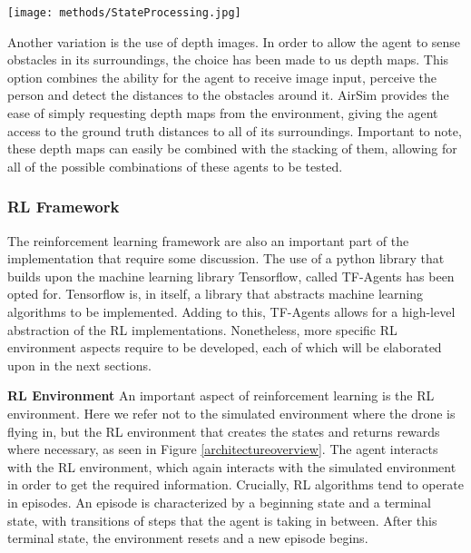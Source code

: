 \begin{Figure}
    \centering
    \texttt{[image: methods/StateProcessing.jpg]}
    \label{pipeline}
\end{Figure}

Another variation is the use of depth images. 
In order to allow the agent to sense obstacles in its surroundings, the choice has been made 
to us depth maps. This option combines the ability for the agent to receive image input, 
perceive the person and detect the distances to the obstacles around it. AirSim provides 
the ease of simply requesting depth maps from the environment, giving the agent access to 
the ground truth distances to all of its surroundings. Important to note, these depth 
maps can easily be combined with the stacking of them, allowing for all of the possible 
combinations of these agents to be tested.  \newline

\subsubsection{RL Framework} \label{RLframe}
The reinforcement learning framework are also an important part of the implementation that 
require some discussion. The use of a python library that builds 
upon the machine learning library Tensorflow, called TF-Agents has been opted for. Tensorflow is, 
in itself, 
a library that abstracts machine learning algorithms to be implemented. Adding to this,  
TF-Agents allows for a high-level abstraction of the RL implementations. Nonetheless, 
more specific RL environment aspects require to be developed, each of which 
will be elaborated upon in the next sections. \newline

\noindent
\textbf{RL Environment} \newline  
An important aspect of reinforcement learning is the RL environment. Here we refer not to 
the simulated environment where the drone is flying in, but the RL environment that creates 
the states 
and returns rewards where necessary, as seen in Figure \ref{architectureoverview}. The agent 
interacts with the RL environment, which again interacts
with the simulated environment in order to get the required information. Crucially, RL algorithms 
tend to operate in episodes. An episode is characterized by a beginning state and a terminal state, with 
transitions of steps that the agent is taking in between. After this terminal state, the environment 
resets and a new episode begins. 

